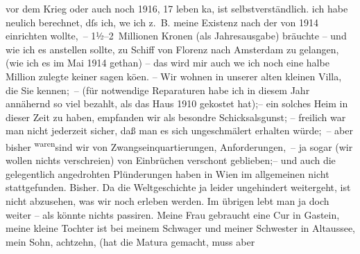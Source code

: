 \begin{ledgroupsized}[t]{13cm}
                    vor dem Krieg oder auch noch 1916, 17 leben ka{\geminationn}, ist selbstverständlich. ich habe neulich
                    berechnet, dſs ich, we{\geminationn} ich z. B. meine Existenz
                    nach  der von 1914 einrichten
                    wollte, – 1½–2 Millionen Kronen \introOben{}(als Jahresausgabe)\introOben{}
                    bräuchte – und wie ich es anstellen sollte, zu Schiff von Florenz nach Amsterdam
                    zu gelangen, (wie ich es im Mai 1914 gethan) – das wird mir \introOben{}auch we{\geminationn} ich noch eine halbe
                        Million zulegte\introOben{} keiner sagen kö{\geminationn}en. – Wir
                    wohnen  in unserer alten kleinen Villa, die
                    Sie kennen; – (für notwendige Reparaturen habe ich in diesem Jahr annähernd so
                    viel bezahlt, als das Haus 1910 gekostet hat);– ein solches Heim in
                    dieser Zeit \introOben{}zu\introOben{} haben, empfanden wir als besondre
                    Schicksalsgunst; – freilich  war man nicht
                    jederzeit sicher, daß man es sich unge{\pb}schmälert erhalten würde; – aber bisher \substVorne{}\textsuperscript{waren}\substDazwischen{}sind\substHinten{} wir von Zwangseinquartierungen, Anforderungen, – ja sogar (wir wollen
                    nichts verschreien) von Einbrüchen verschont geblieben;– und auch die
                    gelegentlich angedrohten Plünderungen haben in Wien im allgemeinen nicht stattgefunden. Bisher. Da die Weltgeschichte
                    ja leider ungehindert weitergeht, ist nicht abzusehen, was wir noch erleben
                    werden. Im übrigen lebt man ja doch weiter – als könnte nichts passiren. Meine
                        Frau gebraucht eine Cur
                    in Gastein, meine kleine Tochter ist bei meinem Schwager und meiner Schwester in Altaussee, mein Sohn, achtzehn, (hat die Matura gemacht, muss aber

\end{ledgroupsized}
